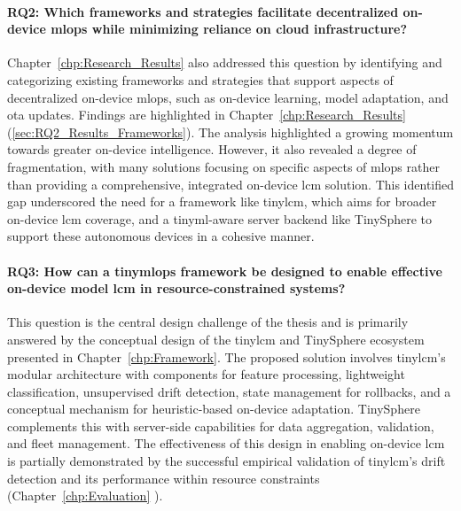 \paragraph{RQ2: Which frameworks and strategies facilitate decentralized on-device \gls{mlops} while minimizing reliance on cloud infrastructure?}
Chapter~\ref{chp:Research_Results} also addressed this question by identifying and categorizing existing frameworks and strategies that support aspects of decentralized on-device \gls{mlops}, such as on-device learning, model adaptation, and \gls{ota} updates. Findings are highlighted in Chapter~\ref{chp:Research_Results} (\ref{sec:RQ2_Results_Frameworks}). The analysis highlighted a growing momentum towards greater on-device intelligence. However, it also revealed a degree of fragmentation, with many solutions focusing on specific aspects of \gls{mlops} rather than providing a comprehensive, integrated on-device \gls{lcm} solution. This identified gap underscored the need for a framework like \gls{tinylcm}, which aims for broader on-device \gls{lcm} coverage, and a \gls{tinyml}-aware server backend like TinySphere to support these autonomous devices in a cohesive manner.

\paragraph{RQ3: How can a \gls{tinymlops} framework be designed to enable effective on-device model \gls{lcm} in resource-constrained systems?}
This question is the central design challenge of the thesis and is primarily answered by the conceptual design of the \gls{tinylcm} and TinySphere ecosystem presented in Chapter~\ref{chp:Framework}. The proposed solution involves \gls{tinylcm}'s modular architecture with components for feature processing, lightweight classification, unsupervised drift detection, state management for rollbacks, and a conceptual mechanism for heuristic-based on-device adaptation. TinySphere complements this with server-side capabilities for data aggregation, validation, and fleet management. The effectiveness of this design in enabling on-device \gls{lcm} is partially demonstrated by the successful empirical validation of \gls{tinylcm}'s drift detection and its performance within resource constraints (Chapter~\ref{chp:Evaluation} ).

